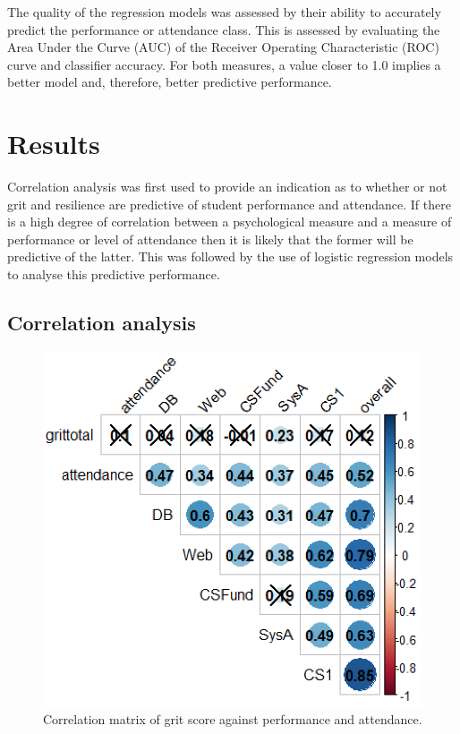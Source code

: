 \documentclass[sigconf]{acmart}
\begin{document}
The quality of the regression models was assessed by their ability to accurately predict the performance or attendance class. This is assessed by evaluating the Area Under the Curve (AUC) of the Receiver Operating Characteristic (ROC) curve and classifier accuracy. For both measures, a value closer to 1.0 implies a better model and, therefore, better predictive performance. 

\section {Results}
Correlation analysis was first used to provide an indication as to whether or not grit and resilience are predictive of student performance and attendance. If there is a high degree of correlation between a psychological measure and a measure of performance or level of attendance then it is likely that the former will be predictive of the latter. This was followed by the use of logistic regression models to analyse this predictive performance.

\subsection{Correlation analysis}

\begin{figure}[h]
\centering
\includegraphics[width=.9\linewidth]{images/cor_plot_grit.png}
\caption{Correlation matrix of grit score against performance and attendance.}
\label{fig:cor_grit} 
\end{figure}
\end{document}
